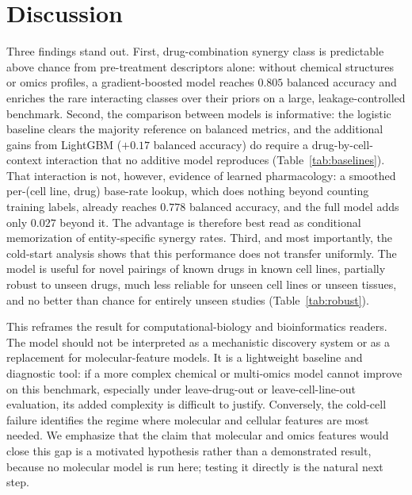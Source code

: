 \documentclass[11pt]{article}
\begin{document}
\section{Discussion}
Three findings stand out. First, drug-combination synergy class is predictable above chance from
pre-treatment descriptors alone: without chemical structures or omics profiles, a gradient-boosted
model reaches $0.805$ balanced accuracy and enriches the rare interacting classes over their priors on
a large, leakage-controlled benchmark. Second, the comparison between models is informative: the
logistic baseline clears the majority reference on balanced metrics, and the additional gains from
LightGBM ($+0.17$ balanced accuracy) do require a drug-by-cell-context interaction that no additive
model reproduces (Table~\ref{tab:baselines}). That interaction is not, however, evidence of learned
pharmacology: a smoothed per-(cell line, drug) base-rate lookup, which does nothing beyond counting
training labels, already reaches $0.778$ balanced accuracy, and the full model adds only $0.027$ beyond
it. The advantage is therefore best read as conditional memorization of entity-specific synergy rates.
Third, and most importantly, the cold-start analysis shows that this
performance does not transfer uniformly. The model is useful for novel pairings of known drugs in
known cell lines, partially robust to unseen drugs, much less reliable for unseen cell lines or unseen
tissues, and no better than chance for entirely unseen studies (Table~\ref{tab:robust}).

This reframes the result for computational-biology and bioinformatics readers. The model should not be
interpreted as a mechanistic discovery system or as a replacement for molecular-feature models. It is
a lightweight baseline and diagnostic tool: if a more complex chemical or multi-omics model cannot
improve on this benchmark, especially under leave-drug-out or leave-cell-line-out evaluation, its added
complexity is difficult to justify. Conversely, the cold-cell failure identifies the regime where
molecular and cellular features are most needed. We emphasize that the claim that molecular and omics
features would close this gap is a motivated hypothesis rather than a demonstrated result, because no
molecular model is run here; testing it directly is the natural next step.
\end{document}
